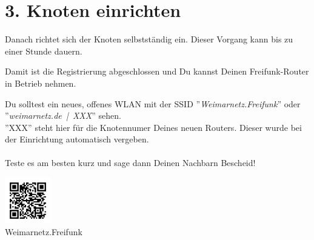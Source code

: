 \documentclass[10pt,a4paper,notumble]{leaflet}
\begin{document}



\section{3. Knoten einrichten}
Danach richtet sich der Knoten selbstständig ein. Dieser Vorgang kann bis zu einer Stunde dauern.

Damit ist die Registrierung abgeschlossen und Du kannst Deinen Freifunk-Router in Betrieb nehmen.

Du solltest ein neues, offenes WLAN mit der SSID ''\mbox{\textit{Weimarnetz.Freifunk}}'' oder ''\mbox{\textit{weimarnetz.de | XXX}}'' sehen.\\
''XXX'' steht hier für die Knotennumer Deines neuen Routers. Dieser wurde bei der Einrichtung automatisch vergeben.
\\\\
Teste es am besten kurz und sage dann Deinen Nachbarn Bescheid!  

\begin{center}
\includegraphics[width=20mm]{Weimarnetz.Freifunk.qr.png}\\
\footnotesize Weimarnetz.Freifunk
\end{center}
\end{document}
